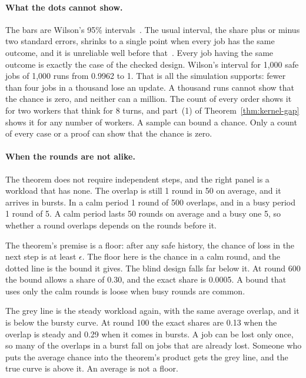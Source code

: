 \paragraph{What the dots cannot show.}
The bars are Wilson's 95\% intervals~. The usual
interval, the share plus or minus two standard errors, shrinks to a single
point when every job has the same outcome, and it is unreliable well before
that~. Every job having the same outcome is
exactly the case of the checked design. Wilson's interval for 1,000 safe
jobs of 1,000 runs from 0.9962 to 1. That is all the simulation supports:
fewer than four jobs in a thousand lose an update. A thousand runs cannot
show that the chance is zero, and neither can a million. The count of every
order shows it for two workers that think for 8 turns, and part~(1) of
Theorem~\ref{thm:kernel-gap} shows it for any number of workers. A sample
can bound a chance. Only a count of every case or a proof can show that the
chance is zero.

\paragraph{When the rounds are not alike.}
The theorem does not require independent steps, and the right panel is a
workload that has none. The overlap is still 1 round in 50 on average, and
it arrives in bursts. In a calm period 1 round of 500 overlaps, and in a
busy period 1 round of 5. A calm period lasts 50 rounds on average and a
busy one 5, so whether a round overlaps depends on the rounds before it.

The theorem's premise is a floor: after any safe history, the chance of
loss in the next step is at least $\epsilon$. The floor here is the chance
in a calm round, and the dotted line is the bound it gives. The blind
design falls far below it. At round 600 the bound allows a share of 0.30,
and the exact share is 0.0005. A bound that uses only the calm rounds is
loose when busy rounds are common.

The grey line is the steady workload again, with the same average overlap,
and it is below the bursty curve. At round 100 the exact shares are 0.13
when the overlap is steady and 0.29 when it comes in bursts. A job can be
lost only once, so many of the overlaps in a burst fall on jobs that are
already lost. Someone who puts the average chance into the theorem's
product gets the grey line, and the true curve is above it. An average is
not a floor.

